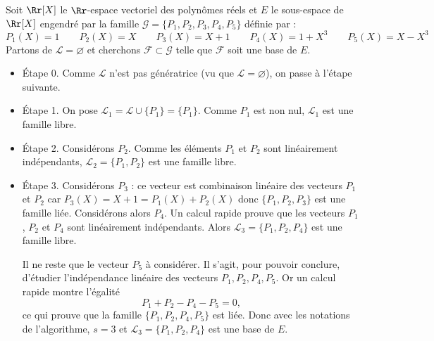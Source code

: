 \documentclass[class=report,crop=false]{standalone}
\begin{document}
\begin{exemple}
Soit $\Rr[X]$ le $\Rr$-espace vectoriel des polynômes réels et
$E$ le sous-espace de $\Rr[X]$ engendré par la famille
$\mathcal{G} = \{P_1, P_2, P_3, P_4, P_5\}$  définie par :
$$P_1(X)=1 \qquad P_2(X)=X \qquad P_3(X)=X+1 \qquad
P_4(X)=1+X^3 \qquad P_5(X)=X-X^3$$
Partons de $\mathcal{L} = \varnothing$ et cherchons
$\mathcal{F} \subset \mathcal{G}$ telle que $\mathcal{F}$ soit une base de $E$.

\begin{itemize}
  \item \'Etape 0. Comme $\mathcal{L}$ n'est pas génératrice (vu que $\mathcal{L} = \varnothing$),
  on passe à l'étape suivante.


  \item \'Etape 1. On pose $\mathcal{L}_1 = \mathcal{L} \cup \{ P_1 \} = \{ P_1 \}$.
  Comme  $P_1$ est non nul, $\mathcal{L}_1$ est une famille libre.

  \item \'Etape 2. Considérons $P_2$.
  Comme les éléments $P_1$ et $P_2$ sont linéairement indépendants,
  $\mathcal{L}_2 = \{ P_1, P_2 \}$ est une famille libre.

  \item \'Etape 3. Considérons $P_3$ :
  ce vecteur est combinaison linéaire des vecteurs  $P_1$ et $P_2$ car
  $P_3(X) = X+1 = P_1(X) + P_2(X)$ donc $\{P_1, P_2, P_3 \}$ est une famille liée.
  Considérons alors $P_4$.  Un calcul rapide prouve que les vecteurs $P_1$, $P_2$  et
  $P_4$ sont linéairement indépendants. Alors  $\mathcal{L}_3 = \{P_1, P_2, P_4\}$
  est une famille libre.

  Il ne reste que le vecteur $P_5$ à considérer.
  Il s'agit, pour pouvoir conclure, d'étudier l'indépendance linéaire des vecteurs
  $P_1, P_2, P_4, P_5$. Or un calcul rapide montre l'égalité
  $$P_1+P_2-P_4-P_5=0,$$
  ce qui prouve que la famille  $\{P_1, P_2, P_4, P_5\}$ est liée.
  Donc avec les notations de l'algorithme, $s=3$ et
  $\mathcal{L}_{3}=\{P_1, P_2, P_4\}$ est une base de $E$.
\end{itemize}
\end{exemple}



\end{document}
